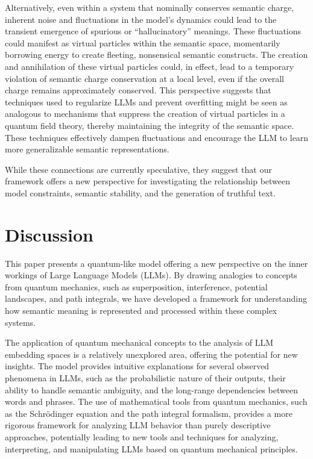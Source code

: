 \documentclass[prd,amsmath,amssymb,12pt]{revtex4}
\begin{document}
Alternatively, even within a system that nominally conserves semantic charge, inherent noise
and fluctuations in the model's dynamics could lead to the transient emergence of spurious
or ``hallucinatory'' meanings. These fluctuations could manifest as virtual particles within
the semantic space, momentarily borrowing energy to create fleeting, nonsensical semantic
constructs. The creation and annihilation of these virtual particles could, in effect, lead
to a temporary violation of semantic charge conservation at a local level, even if the
overall charge remains approximately conserved. This perspective suggests that techniques
used to regularize LLMs and prevent overfitting might be seen as analogous to mechanisms
that suppress the creation of virtual particles in a quantum field theory, thereby maintaining
the integrity of the semantic space. These techniques effectively dampen fluctuations and
encourage the LLM to learn more generalizable semantic representations.

While these connections are currently speculative, they suggest that our framework offers
a new perspective for investigating the relationship between model constraints, semantic
stability, and the generation of truthful text.

\section{Discussion}

This paper presents a quantum-like model offering a new perspective on the inner workings
of Large Language Models (LLMs). By drawing analogies to concepts from quantum mechanics,
such as superposition, interference, potential landscapes, and path integrals, we have
developed a framework for understanding how semantic meaning is represented and
processed within these complex systems.

The application of quantum mechanical concepts to the analysis of LLM embedding spaces
is a relatively unexplored area, offering the potential for new insights. The model provides
intuitive explanations for several observed phenomena in LLMs, such as the probabilistic
nature of their outputs, their ability to handle semantic ambiguity, and the long-range
dependencies between words and phrases. The use of mathematical tools from quantum mechanics,
such as the Schrödinger equation and the path integral formalism, provides a more rigorous
framework for analyzing LLM behavior than purely descriptive approaches, potentially leading
to new tools and techniques for analyzing, interpreting, and manipulating LLMs based on
quantum mechanical principles.
\end{document}
